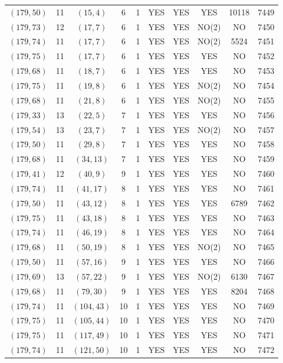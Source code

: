 \begin{longtable}{|c|c|c|c|c|c|c|c|c|c|}
$(179, 50)$ & 11 & $(15, 4)$ & 6 & 1 & YES & YES & YES & 10118 & 7449\\
$(179, 73)$ & 12 & $(17, 7)$ & 6 & 1 & YES & YES & NO(2) & NO & 7450\\
$(179, 74)$ & 11 & $(17, 7)$ & 6 & 1 & YES & YES & NO(2) & 5524 & 7451\\
$(179, 75)$ & 11 & $(17, 7)$ & 6 & 1 & YES & YES & YES & NO & 7452\\
$(179, 68)$ & 11 & $(18, 7)$ & 6 & 1 & YES & YES & YES & NO & 7453\\
$(179, 75)$ & 11 & $(19, 8)$ & 6 & 1 & YES & YES & NO(2) & NO & 7454\\
$(179, 68)$ & 11 & $(21, 8)$ & 6 & 1 & YES & YES & NO(2) & NO & 7455\\
$(179, 33)$ & 13 & $(22, 5)$ & 7 & 1 & YES & YES & YES & NO & 7456\\
$(179, 54)$ & 13 & $(23, 7)$ & 7 & 1 & YES & YES & NO(2) & NO & 7457\\
$(179, 50)$ & 11 & $(29, 8)$ & 7 & 1 & YES & YES & YES & NO & 7458\\
$(179, 68)$ & 11 & $(34, 13)$ & 7 & 1 & YES & YES & YES & NO & 7459\\
$(179, 41)$ & 12 & $(40, 9)$ & 9 & 1 & YES & YES & YES & NO & 7460\\
$(179, 74)$ & 11 & $(41, 17)$ & 8 & 1 & YES & YES & YES & NO & 7461\\
$(179, 50)$ & 11 & $(43, 12)$ & 8 & 1 & YES & YES & YES & 6789 & 7462\\
$(179, 75)$ & 11 & $(43, 18)$ & 8 & 1 & YES & YES & YES & NO & 7463\\
$(179, 74)$ & 11 & $(46, 19)$ & 8 & 1 & YES & YES & YES & NO & 7464\\
$(179, 68)$ & 11 & $(50, 19)$ & 8 & 1 & YES & YES & NO(2) & NO & 7465\\
$(179, 50)$ & 11 & $(57, 16)$ & 9 & 1 & YES & YES & YES & NO & 7466\\
$(179, 69)$ & 13 & $(57, 22)$ & 9 & 1 & YES & YES & NO(2) & 6130 & 7467\\
$(179, 68)$ & 11 & $(79, 30)$ & 9 & 1 & YES & YES & YES & 8204 & 7468\\
$(179, 74)$ & 11 & $(104, 43)$ & 10 & 1 & YES & YES & YES & NO & 7469\\
$(179, 75)$ & 11 & $(105, 44)$ & 10 & 1 & YES & YES & YES & NO & 7470\\
$(179, 75)$ & 11 & $(117, 49)$ & 10 & 1 & YES & YES & YES & NO & 7471\\
$(179, 74)$ & 11 & $(121, 50)$ & 10 & 1 & YES & YES & YES & NO & 7472\\

\end{longtable}

